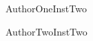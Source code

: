 

\author{\AuthorOneName}
\orcid{\AuthorOneOrcid}
\affiliation{%
  \institution{\AuthorOneInst}
  \city{\AuthorOneCity}
  \country{\AuthorOneCountry}
}
\ifcsname AuthorOneInstTwo\endcsname
\affiliation{%
  \institution{\AuthorOneInstTwo}
  \city{\AuthorOneCityTwo}
  \country{\AuthorOneCountryTwo}
}
\fi
\email{\AuthorOneEmail}

\author{\AuthorTwoName}
\orcid{\AuthorTwoOrcid}
\affiliation{%
  \institution{\AuthorTwoInst}
  \city{\AuthorTwoCity}
  \country{\AuthorTwoCountry}
}
\ifcsname AuthorTwoInstTwo\endcsname
\affiliation{%
  \institution{\AuthorTwoInstTwo}
  \city{\AuthorTwoCityTwo}
  \country{\AuthorTwoCountryTwo}
}
\fi
\email{\AuthorTwoEmail}


\renewcommand{\shortauthors}{\ShortAuthors} %
